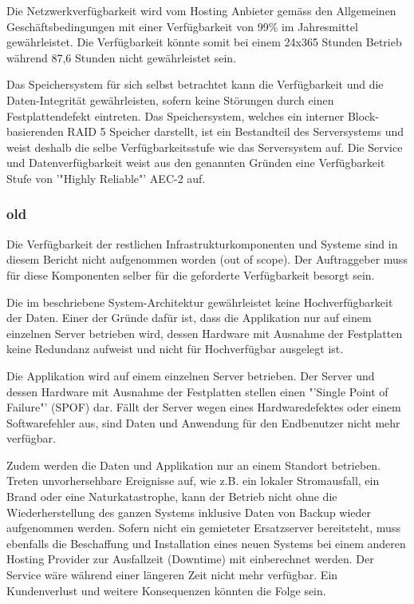 Die Netzwerkverfügbarkeit wird vom Hosting Anbieter gemäss den Allgemeinen Geschäftsbedingungen \cite{Ag2009} mit einer Verfügbarkeit von 99\% im Jahresmittel gewährleistet. Die Verfügbarkeit könnte somit bei einem 24x365 Stunden Betrieb während 87,6 Stunden nicht gewährleistet sein.

Das Speichersystem für sich selbst betrachtet kann die Verfügbarkeit und die Daten-Integrität gewährleisten, sofern keine Störungen durch einen Festplattendefekt eintreten. Das Speichersystem, welches ein interner Block-basierenden RAID 5 Speicher darstellt, ist ein Bestandteil des Serversystems und weist deshalb die selbe Verfügbarkeitsstufe wie das Serversystem auf. Die Service und Datenverfügbarkeit weist aus den genannten Gründen eine Verfügbarkeit Stufe von '"Highly Reliable"' AEC-2 auf.
\subsubsection{old}

Die Verfügbarkeit der restlichen Infrastrukturkomponenten und Systeme sind in diesem Bericht nicht aufgenommen worden (out of scope).
 \cite{Ag2009} Der Auftraggeber muss für diese Komponenten selber für die geforderte Verfügbarkeit besorgt sein.

Die im   beschriebene System-Architektur gewährleistet keine Hochverfügbarkeit der Daten. Einer der Gründe dafür ist, dass die Applikation nur auf einem einzelnen Server betrieben wird, dessen Hardware mit Ausnahme der Festplatten keine Redundanz aufweist und nicht für Hochverfügbar ausgelegt ist. 

Die Applikation wird auf einem einzelnen Server betrieben. Der Server und dessen Hardware mit Ausnahme der Festplatten stellen einen "'Single Point of Failure"' (SPOF) dar. Fällt der Server wegen eines Hardwaredefektes oder einem Softwarefehler aus, sind Daten und Anwendung für den Endbenutzer nicht mehr verfügbar.

Zudem werden die Daten und Applikation nur an einem Standort betrieben. Treten unvorhersehbare Ereignisse auf, wie z.B. ein lokaler Stromausfall, ein Brand oder eine Naturkatastrophe, kann der Betrieb nicht ohne die Wiederherstellung des ganzen Systems inklusive Daten von Backup wieder aufgenommen werden. Sofern nicht ein gemieteter Ersatzserver bereitsteht, muss ebenfalls die Beschaffung und Installation eines neuen Systems bei einem anderen Hosting Provider zur Ausfallzeit (Downtime) mit einberechnet werden. Der Service wäre während einer längeren Zeit nicht mehr verfügbar. Ein Kundenverlust und weitere Konsequenzen könnten die Folge sein.

